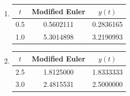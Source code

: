 \begin{myexercise}
\begin{mysolution}
\begin{enumerate}[label=(\alph*)]
\item 
\begin{center}
\begin{tabular}{ccc}
\hline
$t$ & Modified Euler & $y(t)$ \\
\hline
0.5 & 0.5602111 & 0.2836165 \\
1.0 & 5.3014898 & 3.2190993 \\
\hline
\end{tabular}
\end{center}
\item
\begin{center}
\begin{tabular}{ccc}
\hline
$t$ & Modified Euler & $y(t)$ \\
\hline
2.5 & 1.8125000 & 1.8333333 \\
3.0 & 2.4815531 & 2.5000000 \\
\hline
\end{tabular}
\end{center}
\end{enumerate}
\end{mysolution}
\end{myexercise}



